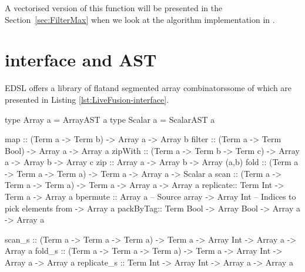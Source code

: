 \documentclass[preamble.tex]{subfiles}
\begin{document}
A vectorised version of this function will be presented in the Section~\ref{sec:FilterMax} when we look at the \QuickHull algorithm implementation in \DPH.




\section{\LiveFusion interface and AST}
\label{sec:AST}

\LiveFusion EDSL offers a library of flat\iflatcomb and segmented array combinators\isegcomb some of which are presented in Listing \ref{lst:LiveFusion-interface}.

\begin{hscode2}[%
    caption={\LiveFusion interface functions. Typeclass constraints on array elements have been omitted for brevity.},%
    label=lst:LiveFusion-interface,%
]
type Array  a = ArrayAST  a
type Scalar a = ScalarAST a

map      :: (Term a -> Term b) -> Array a -> Array b
filter   :: (Term a -> Term Bool) -> Array a -> Array a
zipWith  :: (Term a -> Term b -> Term c) -> Array a -> Array b -> Array c
zip      :: Array a -> Array b -> Array (a,b)
fold     :: (Term a -> Term a -> Term a) -> Term a -> Array a -> Scalar a
scan     :: (Term a -> Term a -> Term a) -> Term a -> Array a -> Array a
replicate:: Term Int -> Term a -> Array a
bpermute :: Array a      -- Source array
         -> Array Int    -- Indices to pick elements from
         -> Array a
packByTag:: Term Bool -> Array Bool -> Array a -> Array a

scan_s   :: (Term a -> Term a -> Term a) -> Term a
         -> Array Int -> Array a -> Array a
fold_s   :: (Term a -> Term a -> Term a) -> Term a
         -> Array Int -> Array a -> Array a
replicate_s :: Term Int -> Array Int -> Array a -> Array a
\end{hscode2}
\end{document}
